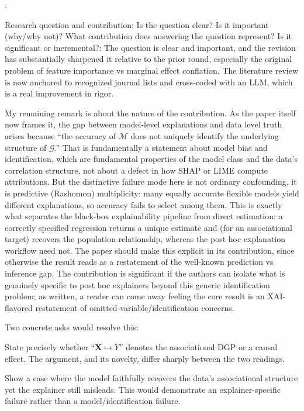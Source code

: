 \documentclass[11pt]{article}
\newcounter{se}[section]
\newcounter{reviewer}
\newcounter{point}[reviewer]
\renewcommand{\thepoint}{R\,\thereviewer.\arabic{point}}
\newenvironment{point}{
    \refstepcounter{point} \bigskip \noindent {\textbf{\thepoint}}: \rmfamily \itshape
}{\medskip}
\begin{document}
\begin{point}
Research question and contribution: Is the question clear? Is it important (why/why not)? What contribution does answering the question represent? Is it significant or incremental?: The question is clear and important, and the revision has substantially sharpened it relative to the prior round, especially the original problem of feature importance vs marginal effect conflation. The literature review is now anchored to recognized journal lists and cross-coded with an LLM, which is a real improvement in rigor.

My remaining remark is about the nature of the contribution. As the paper itself now frames it, the gap between model-level explanations and data level truth arises because ``the accuracy of $\mathcal{M}$ does not uniquely identify the underlying structure of $\mathcal{G}$.'' That is fundamentally a statement about model bias and identification, which are fundamental properties of the model class and the data's correlation structure, not about a defect in how SHAP or LIME compute attributions. But the distinctive failure mode here is not ordinary confounding, it is predictive (Rashomon) multiplicity: many equally accurate flexible models yield different explanations, so accuracy fails to select among them. This is exactly what separates the black-box explainability pipeline from direct estimation: a correctly specified regression returns a unique estimate and (for an associational target) recovers the population relationship, whereas the post hoc explanation workflow need not. The paper should make this explicit in its contribution, since otherwise the result reads as a restatement of the well-known prediction vs inference gap. The contribution is significant if the authors can isolate what is genuinely specific to post hoc explainers beyond this generic identification problem; as written, a reader can come away feeling the core result is an XAI-flavored restatement of omitted-variable/identification concerns.

Two concrete asks would resolve this:

State precisely whether ``$\mathbf{X} \mapsto Y$'' denotes the associational DGP or a causal effect. The argument, and its novelty, differ sharply between the two readings.

Show a case where the model faithfully recovers the data's associational structure yet the explainer still misleads. This would demonstrate an explainer-specific failure rather than a model/identification failure.
\end{point}
\end{document}
